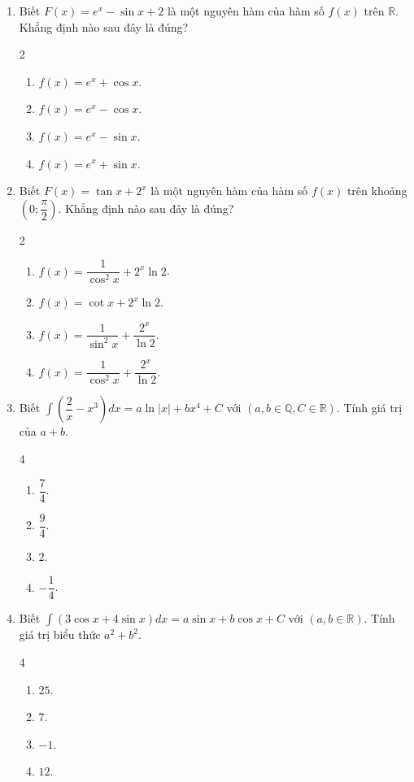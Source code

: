 \documentclass[12pt]{article}
\begin{document}
\begin{enumerate}[label=\textbf{Câu \arabic*.}]
		\item Biết $F(x) = e^x - \sin x + 2$ là một nguyên hàm của hàm số $f(x)$ trên $\mathbb{R}$. Khẳng định nào sau đây là đúng?
		\begin{multicols}{2}
			\begin{enumerate}[label=\textbf{\Alph*.}]
				\item $f(x) = e^x + \cos x$.
				\item $f(x) = e^x - \cos x$.
				\item $f(x) = e^x - \sin x$.
				\item $f(x) = e^x + \sin x$.
			\end{enumerate}
		\end{multicols}
		
		\item Biết $F(x) = \tan x + 2^x$ là một nguyên hàm của hàm số $f(x)$ trên khoảng $\left(0; \dfrac{\pi}{2}\right)$. Khẳng định nào sau đây là đúng?
		\begin{multicols}{2}
			\begin{enumerate}[label=\textbf{\Alph*.}]
				\item $f(x) = \dfrac{1}{\cos^2 x} + 2^x \ln 2$.
				\item $f(x) = \cot x + 2^x \ln 2$.
				\item $f(x) = \dfrac{1}{\sin^2 x} + \dfrac{2^x}{\ln 2}$.
				\item $f(x) = \dfrac{1}{\cos^2 x} + \dfrac{2^x}{\ln 2}$.
			\end{enumerate}
		\end{multicols}
		
		\item Biết $\displaystyle \int \left( \dfrac{2}{x} - x^3 \right) dx = a\ln|x| + bx^4 + C$ với $(a, b \in \mathbb{Q}, C \in \mathbb{R})$. Tính giá trị của $a + b$.
		\begin{multicols}{4}
			\begin{enumerate}[label=\textbf{\Alph*.}]
				\item $\dfrac{7}{4}$.
				\item $\dfrac{9}{4}$.
				\item $2$.
				\item $-\dfrac{1}{4}$.
			\end{enumerate}
		\end{multicols}
		
		\item Biết $\displaystyle \int (3\cos x + 4\sin x) dx = a\sin x + b\cos x + C$ với $(a, b \in \mathbb{R})$. Tính giá trị biểu thức $a^2 + b^2$.
		\begin{multicols}{4}
			\begin{enumerate}[label=\textbf{\Alph*.}]
				\item $25$.
				\item $7$.
				\item $-1$.
				\item $12$.
			\end{enumerate}
		\end{multicols}
		

\end{enumerate}
\end{document}
